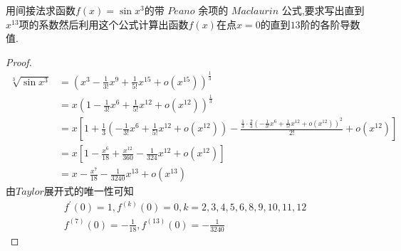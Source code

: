 \documentclass[lang=cn,newtx,10pt,scheme=chinese]{../Template/elegantbook}
\begin{document}
\begin{exercise}
    用间接法求函数\(f(x)=\sin x^3\)的带 $Peano$ 余项的 $Maclaurin$ 公式,要求写出直到\(x^{13}\)项的系数然后利用这个公式计算出函数\(f(x)\)在点\(x = 0\)的直到\(13\)阶的各阶导数值.
    \begin{proof}
        \begin{equation}
            \begin{split}
                \sqrt[3]{\sin x^3}&=\left( x^3-\frac{1}{3!}x^9+\frac{1}{5!}x^{15}+o\left( x^{15} \right) \right) ^{\frac{1}{3}}
\\
&=x\left( 1-\frac{1}{3!}x^6+\frac{1}{5!}x^{12}+o\left( x^{12} \right) \right) ^{\frac{1}{3}}
\\
&=x\left[ 1+\frac{1}{3}\left( -\frac{1}{3!}x^6+\frac{1}{5!}x^{12}+o\left( x^{12} \right) \right) -\frac{\frac{1}{3}\cdot \frac{2}{3}\left( -\frac{1}{3!}x^6+\frac{1}{5!}x^{12}+o\left( x^{12} \right) \right) ^2}{2!}+o\left( x^{12} \right) \right] 
\\
&=x\left[ 1-\frac{x^6}{18}+\frac{x^{12}}{360}-\frac{1}{324}x^{12}+o\left( x^{12} \right) \right]\\
&=x-\frac{x^7}{18}-\frac{1}{3240}x^{13}+o\left( x^{13} \right)
            \end{split}
            \nonumber
        \end{equation}
        由$Taylor$展开式的唯一性可知
        \begin{gather}
            f^{\prime}(0)=1,f^{(k)}(0)=0,k=2,3,4,5,6,8,9,10,11,12\nonumber\\
            f^{(7)}(0)=-\frac{1}{18},f^{(13)}(0)=-\frac{1}{3240}\nonumber
        \end{gather}
    
\end{proof}
\end{exercise}
\end{document}
